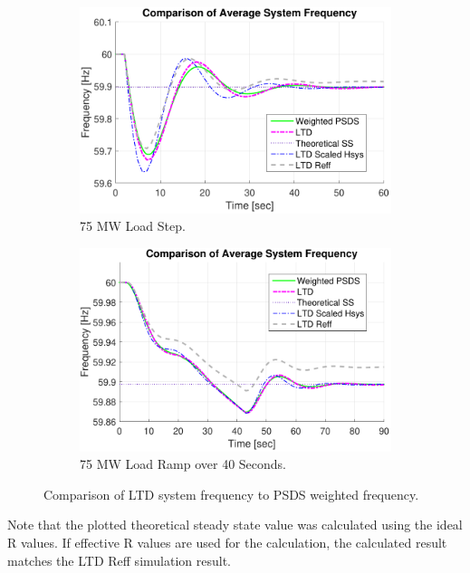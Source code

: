 \documentclass[12pt]{article}
\begin{document}
\begin{figure}[h!]
	\centering
	\begin{subfigure}{.48\linewidth}
		\centering
		\includegraphics[width=\figW\linewidth]{HReffCompStep}\vspace{-.5em}
		\caption{75 MW Load Step.}
		\label{fig:sfig1}
	\end{subfigure}\hspace{1em}%
	\begin{subfigure}{.48\linewidth}
		\centering
		\includegraphics[width=\figW\linewidth]{HReffCompRamp}\vspace{-.5em}
		\caption{75 MW Load Ramp over 40 Seconds.}
		\label{fig:sfig2}
	\end{subfigure}
	\caption{Comparison of LTD system frequency to PSDS weighted frequency.}
	\label{fig:featureComp}		 
\end{figure}%

Note that the plotted theoretical steady state value was calculated using the ideal R values. If effective R values are used for the calculation, the calculated result matches the LTD Reff simulation result.
\end{document}
